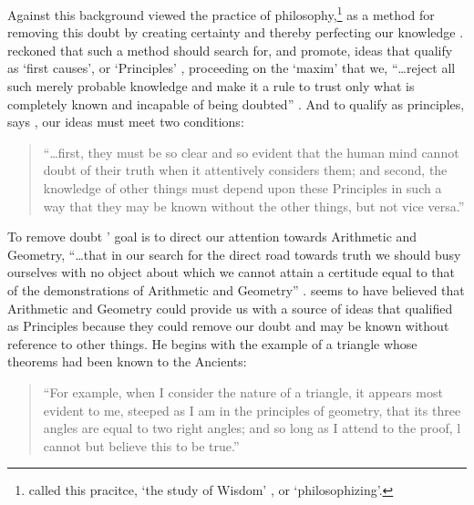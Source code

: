 \documentclass[a4paper, 12pt]{article}
\begin{document}
Against this background \citeauthor{descartes_principles_1982} viewed the practice of philosophy,\footnote{\citeauthor{descartes_principles_1982} called this pracitce, `the study of Wisdom' \citet[p.~xvii]{descartes_principles_1982}, or `philosophizing'.} as a method for removing this doubt by creating certainty and thereby perfecting our knowledge \citeyearpar[p.~xvii]{descartes_principles_1982}. \citeauthor{descartes_principles_1982} reckoned that such a method should  search for, and promote, ideas that qualify as `first causes', or `Principles' \citeyearpar[p.~xvii]{descartes_principles_1982}, proceeding on the `maxim' that we, ``\dots reject all such merely probable knowledge and make it a rule to trust only what is completely known and incapable of being doubted'' \citep[Rule~II,p.~3]{descartes_philosophical_1911}. And to qualify as principles, says \citeauthor{descartes_principles_1982}, our ideas must meet two conditions:

\begin{quotation}
    ``\dots first, they must be so clear and so evident that the human mind cannot doubt of their truth when it attentively considers them; and second, the knowledge of other things must depend upon these Principles in such a way that they may be known without the other things, but not vice versa.'' \citep[p.~xvii]{descartes_principles_1982}
\end{quotation}

To remove doubt \citeauthor{descartes_principles_1982}' goal is to direct our attention towards Arithmetic and Geometry, ``\dots that in our search for the direct road towards truth we should busy ourselves with no object about which we cannot attain a certitude equal to that of the demonstrations of Arithmetic and Geometry'' \citep[Rule~II,p.~5]{descartes_philosophical_1911}. \citeauthor{descartes_principles_1982} seems to have believed that Arithmetic and Geometry could provide us with a source of ideas that qualified as  Principles because they could remove our doubt and may be known without reference to other things. He begins with the example of a triangle whose theorems had been known to the Ancients:

\begin{quotation}
    ``For example, when I consider the nature of a triangle, it appears most evident to me, steeped as I am in the principles of geometry, that its three angles are equal to two right angles; and so long as I attend to the proof, l cannot but believe this to be true.'' \citep[p.~48, \S~40]{descartes_meditations_2013}
\end{quotation}
\end{document}
